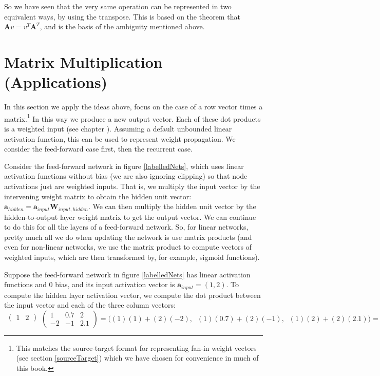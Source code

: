 So we have seen that the very same operation can be represented in two equivalent ways, by using the transpose. This is based on the theorem that  $\mathbf{A}v =  v^T\mathbf{A}^T$, and is the basis of the ambiguity mentioned above. 

\section{Matrix Multiplication (Applications)}


In this section we apply the ideas above, focus on the case of a row vector times a matrix.\footnote{This matches the source-target format for representing fan-in weight vectors (see section \ref{sourceTarget}) which we have chosen for convenience in much of this book.} In this way we produce a new output vector. Each of these dot products is a weighted input (see chapter ). Assuming a default unbounded linear activation function, this can be used to represent weight propagation. We consider the feed-forward case first, then the recurrent case.

Consider the feed-forward network in figure \ref{labelledNets}, which uses linear activation functions without bias (we are also ignoring clipping) so that node activations just are weighted inputs. That is, we multiply the input vector by the intervening weight matrix to obtain the hidden unit vector:  $\textbf{a}_{hidden} = \textbf{a}_{input} \textbf{W}_{input,hidden}$. We can then multiply the hidden unit vector by the hidden-to-output layer weight matrix to get the output vector. We can continue to do this for all the layers of a feed-forward network. So, for linear networks, pretty much all we do when updating the network is use matrix products (and even for non-linear networks, we use the matrix product to compute vectors of weighted inputs, which are then transformed by, for example, sigmoid functions).

Suppose the feed-forward network in figure \ref{labelledNets} has linear activation functions and 0 bias, and its input activation vector is $\textbf{a}_{input} = (1,2)$. To compute the hidden layer activation vector, we compute the dot product between the input vector and each of the three column vectors:
\[
  \begin{matrix}\begin{pmatrix}1 & 2\end{pmatrix}\\\mbox{}\end{matrix}
  \begin{pmatrix} 1 & 0.7 & 2 \\ -2 & -1 & 2.1 \end{pmatrix} 
  =
  \bigg( (1)(1) + (2)(-2) ,\;\; (1)(0.7) + (2)(-1) ,\;\; (1)(2)+ (2)(2.1) \bigg)
  =
  \begin{pmatrix}  -3 \;\; -1.3 \;\;\; 6.2  \end{pmatrix}
\]
\vspace*{.1cm} 

